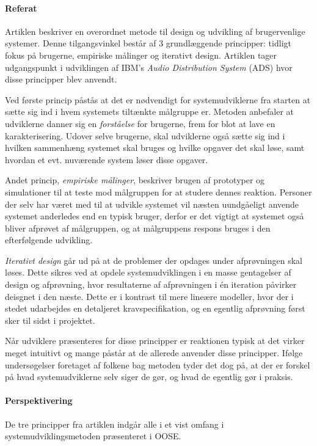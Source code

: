 \documentclass[12pt]{article}
\begin{document}
\paragraph{Referat}
Artiklen \cite{gould1985designing} beskriver en overordnet metode til design og udvikling af brugervenlige systemer. Denne tilgangsvinkel består af 3 grundlæggende principper: tidligt fokus på brugerne, empiriske målinger og iterativt design. Artiklen tager udgangspunkt i udviklingen af IBM's \emph{Audio Distribution System} (ADS) hvor disse principper blev anvendt.

Ved første princip påstås at det er nødvendigt for systemudviklerne fra starten at sætte sig ind i hvem systemets tiltænkte målgruppe er. Metoden anbefaler at udviklerne danner sig en \emph{forståelse} for brugerne, frem for blot at lave en karakterisering. Udover selve brugerne, skal udviklerne også sætte sig ind i hvilken sammenhæng systemet skal bruges og hvilke opgaver det skal løse, samt hvordan et evt. nuværende system løser disse opgaver.

Andet princip, \emph{empiriske målinger}, beskriver brugen af prototyper og simulationer til at teste mod målgruppen for at studere dennes reaktion. Personer der selv har været med til at udvikle systemet vil næsten uundgåeligt anvende systemet anderledes end en typisk bruger, derfor er det vigtigt at systemet også bliver afprøvet af målgruppen, og at målgruppens respons bruges i den efterfølgende udvikling.

\emph{Iterativt design} går ud på at de problemer der opdages under afprøvningen skal løses. Dette sikres ved at opdele systemudviklingen i en masse gentagelser af design og afprøvning, hvor resultaterne af afprøvningen i én iteration påvirker deisgnet i den næste. Dette er i kontrast til mere lineære modeller, hvor der i stedet udarbejdes en detaljeret kravspecifikation, og en egentlig afprøvning først sker til sidst i projektet.

Når udviklere præsenteres for disse principper er reaktionen typisk at det virker meget intuitivt og mange påstår at de allerede anvender disse principper. Ifølge undersøgelser foretaget af folkene bag metoden tyder det dog på, at der er forskel på hvad systemudviklerne selv siger de gør, og hvad de egentlig gør i praksis.

\paragraph{Perspektivering}
De tre principper fra artiklen indgår alle i et vist omfang i systemudviklingsmetoden præsenteret i OOSE.
\end{document}
